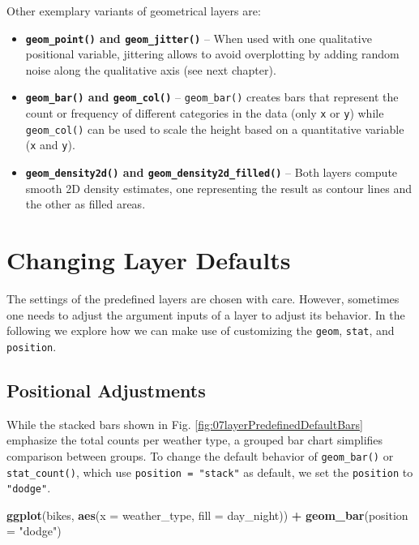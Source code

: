 \documentclass[
]{krantz}
\makeatletter
\newenvironment{Shaded}{\begin{snugshade}}{\end{snugshade}}
\newcommand{\AttributeTok}[1]{\textcolor[rgb]{0.27,0.27,0.27}{#1}}
\newcommand{\FunctionTok}[1]{\textcolor[rgb]{0.27,0.27,0.27}{\textbf{#1}}}
\newcommand{\NormalTok}[1]{#1}
\newcommand{\SpecialCharTok}[1]{\textcolor[rgb]{0.43,0.43,0.43}{\textbf{#1}}}
\newcommand{\StringTok}[1]{\textcolor[rgb]{0.5,0.5,0.5}{#1}}
\providecommand{\tightlist}{%
  \setlength{\itemsep}{0pt}\setlength{\parskip}{0pt}}
\newenvironment{kframe}{%
\medskip{}
\setlength{\fboxsep}{.8em}
 \def\at@end@of@kframe{}%
 \ifinner\ifhmode%
  \def\at@end@of@kframe{\end{minipage}}%
  \begin{minipage}{\columnwidth}%
 \fi\fi%
 \def\FrameCommand##1{\hskip\@totalleftmargin \hskip-\fboxsep
 \colorbox{shadecolor}{##1}\hskip-\fboxsep
     \hskip-\linewidth \hskip-\@totalleftmargin \hskip\columnwidth}%
 \MakeFramed {\advance\hsize-\width
   \@totalleftmargin\z@ \linewidth\hsize
   \@setminipage}}%
 {\par\unskip\endMakeFramed%
 \at@end@of@kframe}
\renewenvironment{Shaded}{\begin{kframe}}{\end{kframe}}
\makeatother
\begin{document}
Other exemplary variants of geometrical layers are:

\begin{itemize}
\tightlist
\item
  \textbf{\texttt{geom\_point()} and \texttt{geom\_jitter()}} -- When used with one qualitative positional variable, jittering allows to avoid overplotting by adding random noise along the qualitative axis (see next chapter).
\item
  \textbf{\texttt{geom\_bar()} and \texttt{geom\_col()}} -- \texttt{geom\_bar()} creates bars that represent the count or frequency of different categories in the data (only \texttt{x} or \texttt{y}) while \texttt{geom\_col()} can be used to scale the height based on a quantitative variable (\texttt{x} and \texttt{y}).
\item
  \textbf{\texttt{geom\_density2d()} and \texttt{geom\_density2d\_filled()}} -- Both layers compute smooth 2D density estimates, one representing the result as contour lines and the other as filled areas.
\end{itemize}

\hypertarget{changing-layer-defaults}{%
\section{Changing Layer Defaults}\label{changing-layer-defaults}}

The settings of the predefined layers are chosen with care. However, sometimes one needs to adjust the argument inputs of a layer to adjust its behavior. In the following we explore how we can make use of customizing the \texttt{geom}, \texttt{stat}, and \texttt{position}.

\hypertarget{positional-adjustments}{%
\subsection{Positional Adjustments}\label{positional-adjustments}}

While the stacked bars shown in Fig. \ref{fig:07layerPredefinedDefaultBars} emphasize the total counts per weather type, a grouped bar chart simplifies comparison between groups. To change the default behavior of \texttt{geom\_bar()} or \texttt{stat\_count()}, which use \texttt{position\ =\ "stack"} as default, we set the \texttt{position} to \texttt{"dodge"}.

\begin{Shaded}
\begin{Highlighting}[]
\FunctionTok{ggplot}\NormalTok{(bikes, }\FunctionTok{aes}\NormalTok{(}\AttributeTok{x =}\NormalTok{ weather\_type, }\AttributeTok{fill =}\NormalTok{ day\_night)) }\SpecialCharTok{+}
  \FunctionTok{geom\_bar}\NormalTok{(}\AttributeTok{position =} \StringTok{"dodge"}\NormalTok{)}
\end{Highlighting}
\end{Shaded}
\end{document}
